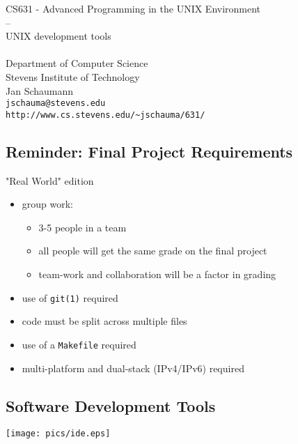\documentclass[xga]{xdvislides}
\begin{document}
\setfontphv

\lhead{\slidetitle}
\cfoot{\relax}
\rfoot{\Gray{\today}}

\vspace*{\fill}
\begin{center}
	\Hugesize
		CS631 - Advanced Programming in the UNIX Environment\\
		-- \\
		UNIX development tools \\
	\hspace*{5mm}\blueline\\ [1em]
	\Normalsize
		Department of Computer Science\\
		Stevens Institute of Technology\\
		Jan Schaumann\\
		\verb+jschauma@stevens.edu+\\
		\verb+http://www.cs.stevens.edu/~jschauma/631/+
\end{center}
\vspace*{\fill}

\subsection{Reminder: Final Project Requirements}
"Real World" edition
\begin{itemize}
	\item group work:
		\begin{itemize}
			\item 3-5 people in a team
			\item all people will get the same grade on the final project
			\item team-work and collaboration will be a factor in grading
		\end{itemize}
	\item use of {\tt git(1)} required
	\item code must be split across multiple files
	\item use of a {\tt Makefile} required
	\item multi-platform and dual-stack (IPv4/IPv6) required
\end{itemize}

\subsection{Software Development Tools}
\begin{center}
	\texttt{[image: pics/ide.eps]}
\end{center}
\end{document}
